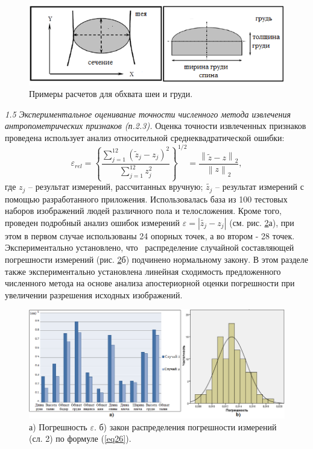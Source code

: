 \begin{figure}[ht!]
\centering
\includegraphics [width=0.8\linewidth] {images/h2.png}
\begin{center}
\caption{Примеры расчетов для обхвата шеи и груди.} \label{img2}
\end{center}
\end{figure}
\textit{1.5 Экспериментальное оценивание точности численного метода извлечения антропометрических признаков (п.2.3).} Оценка точности извлеченных признаков проведена использует анализ относительной среднеквадратической ошибки:
\begin{equation}\label{eq26}
\varepsilon_{rel}=\left\{\frac{\sum^{12}_{j=1}\left(\widetilde{z}_j - z_j\right)^2}{\sum^{12}_{j=1}z_j^2}\right\}^{1/2} = \frac{\left\|\widetilde{z} -z\right\|_2}{\left\|z\right\|_2},
\end{equation}
где $z_j$ -- результат измерений, рассчитанных вручную;
$\widetilde{z_j}$ -- результат измерений с помощью разработанного приложения. Использовалась база из 100 тестовых наборов изображений людей различного пола и телосложения. Кроме того, проведен подробный анализ ошибок измерений $\varepsilon = \left|\widetilde{z_j} - z_j\right|$ (см. рис. \ref{img16}а), при этом в первом случае использованы 24 опорных точек, а во втором - 28 точек. Экспериментально установлено, что  распределение случайной составляющей погрешности измерений (рис. \ref{img16}б) подчинено нормальному закону. В этом разделе также экспериментально установлена линейная сходимость предложенного численного метода на основе анализа апостериорной оценки погрешности при увеличении разрешения исходных изображений.
\begin{figure}[ht!]
\centering
\includegraphics [width=0.96\linewidth] {images/h16.png}
\begin{center}
\caption{а) Погрешность $\varepsilon$. б) закон распределения погрешности измерений (сл. 2) по формуле (\ref{eq26}).} \label{img16}
\end{center}
\end{figure}


